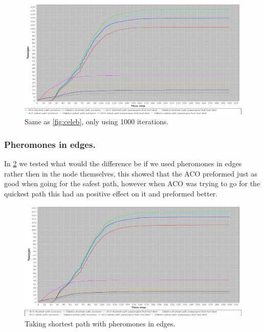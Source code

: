 \begin{figure} [float]
\centering
\hspace*{-1.0in}
\includegraphics[scale=0.35]{images/Graph-using-1000-rounds-140-passangers.png}
\caption{Same as \ref{fig:celeb}, only using 1000 iterations.}
\label{fig:celeb1000}
\end{figure}



\subsubsection{Pheromones in edges.}
In \ref{fig:celebPherInEdge} we tested what would the difference be if we used pheromones in edges rather then in the node themselves, this showed that the ACO preformed just as good when going for the safest path, however when ACO was trying to go for the quickest path this had an positive effect on it and preformed better.

\begin{figure} [float]
\centering
\hspace*{-1.0in}
\includegraphics[scale=0.35]{images/Graph-using-200-rounds-140-passangers-and-one-hazzard-and-ACO-having-pheremons-in-edges.png}
\caption{Taking shortest path with pheromones in edges.}
\label{fig:celebPherInEdge}
\end{figure}


